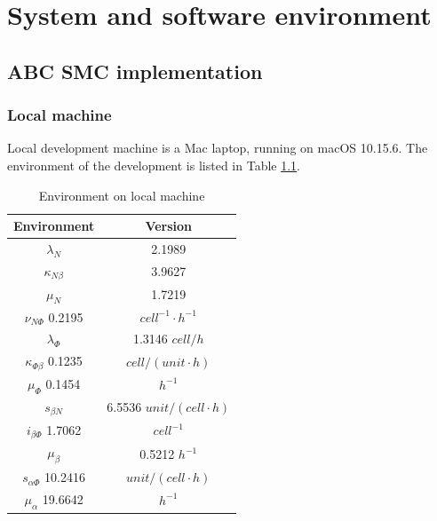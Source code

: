 
\appendix

\chapter{System and software environment}

\section{ABC SMC implementation}

\subsection{Local machine}

Local development machine is a Mac laptop, running on macOS 10.15.6. The environment of the development is listed in Table \ref{table:local_macine}.

\begin{table}[h!]
    \centering
    \begin{tabular}{|c c|}
        \hline
        Environment                 & Version                       \\ [0.5ex]
        \hline\hline
        $\lambda_N$                 & 2.1989                        \\
        $\kappa_{N\beta}$           & 3.9627                        \\
        $\mu_N$                     & 1.7219                        \\
        $\nu_{N\Phi}$  0.2195       & $cell^{-1}\cdotp h^{-1}$      \\
        \hline
        $\lambda_\Phi$              & 1.3146  $cell/h$              \\
        $\kappa_{\Phi\beta}$ 0.1235 & $cell/(unit\cdotp h)$         \\
        $\mu_\Phi$  0.1454          & $h^{-1}$                      \\
        \hline
        $s_{\beta N}$               & 6.5536  $unit/(cell\cdotp h)$ \\
        $i_{\beta\Phi}$  1.7062     & $cell^{-1}$                   \\
        $\mu_\beta$                 & 0.5212  $h^{-1}$              \\
        \hline
        $s_{\alpha\Phi}$  10.2416   & $unit/(cell\cdotp h)$         \\
        $\mu_\alpha$ 19.6642        & $h^{-1}$                      \\
        [1ex]
        \hline
    \end{tabular}
    \caption{Environment on local machine}
    \label{table:local_macine}
\end{table}

